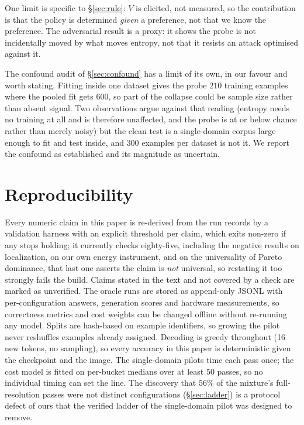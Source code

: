 \documentclass[10pt,twocolumn]{article}
\theoremstyle{plain}
\begin{document}
One limit is specific to \S\ref{sec:rule}: $V$ is elicited, not measured, so the
contribution is that the policy is determined \emph{given} a preference, not
that we know the preference. The adversarial result is a proxy: it shows the probe is not
incidentally moved by what moves entropy, not that it resists an attack
optimised against it.

The confound audit of \S\ref{sec:confound} has a limit of its own, in our
favour and worth stating. Fitting inside one dataset gives the probe $210$
training examples where the pooled fit gets $600$, so part of the collapse could
be sample size rather than absent signal. Two observations argue against that
reading (entropy needs no training at all and is therefore unaffected, and the probe is at or below chance rather than merely noisy) but the clean test is a
single-domain corpus large enough to fit and test inside, and $300$ examples per
dataset is not it. We report the confound as established and its magnitude as
uncertain.

\section{Reproducibility}
\label{sec:reproducibility}

Every numeric claim in this paper is re-derived from the run records by a
validation harness with an explicit threshold per claim, which exits non-zero if
any stops holding; it currently checks eighty-five, including the negative
results on localization, on our own energy instrument, and on the universality
of Pareto dominance, that last one asserts the claim is \emph{not} universal,
so restating it too strongly fails the build. Claims stated in the text and
not covered by a check are marked as unverified. The oracle runs are stored as
append-only JSONL with per-configuration answers, generation scores and hardware
measurements, so correctness metrics and cost weights can be changed offline
without re-running any model. Splits are hash-based on example identifiers, so
growing the pilot never reshuffles examples already assigned. Decoding is greedy
throughout (16 new tokens, no sampling), so every accuracy in this paper is
deterministic given the checkpoint and the image. The single-domain pilots time
each pass once; the cost model is fitted on per-bucket medians over at least
$50$ passes, so no individual timing can set the line. The discovery that
$56\%$ of the mixture's full-resolution passes were not distinct configurations
(\S\ref{sec:ladder}) is a protocol defect of ours that the verified ladder of
the single-domain pilot was designed to remove.
\end{document}
